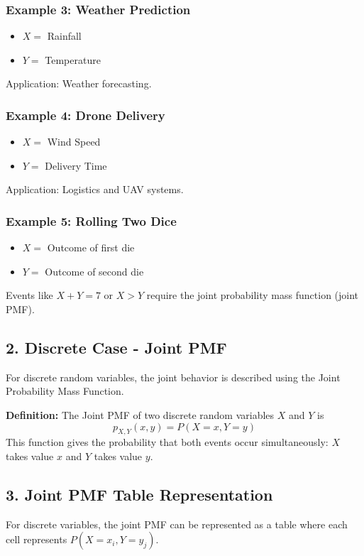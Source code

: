 \documentclass{article}
\begin{document}
\subsubsection*{Example 3: Weather Prediction}
\begin{itemize}
    \item $X =$ Rainfall
    \item $Y =$ Temperature
\end{itemize}
Application: Weather forecasting.

\subsubsection*{Example 4: Drone Delivery}
\begin{itemize}
    \item $X =$ Wind Speed
    \item $Y =$ Delivery Time
\end{itemize}
Application: Logistics and UAV systems.

\subsubsection*{Example 5: Rolling Two Dice}
\begin{itemize}
    \item $X =$ Outcome of first die
    \item $Y =$ Outcome of second die
\end{itemize}
Events like $X+Y=7$ or $X > Y$ require the joint probability mass function (joint PMF).

\subsection*{2. Discrete Case - Joint PMF}
For discrete random variables, the joint behavior is described using the Joint Probability Mass Function.

\textbf{Definition:} The Joint PMF of two discrete random variables $X$ and $Y$ is
\[ p_{X,Y}(x,y) = P(X=x, Y=y) \]
This function gives the probability that both events occur simultaneously: $X$ takes value $x$ and $Y$ takes value $y$.

\subsection*{3. Joint PMF Table Representation}
For discrete variables, the joint PMF can be represented as a table where each cell represents $P(X=x_i, Y=y_j)$.
\end{document}
